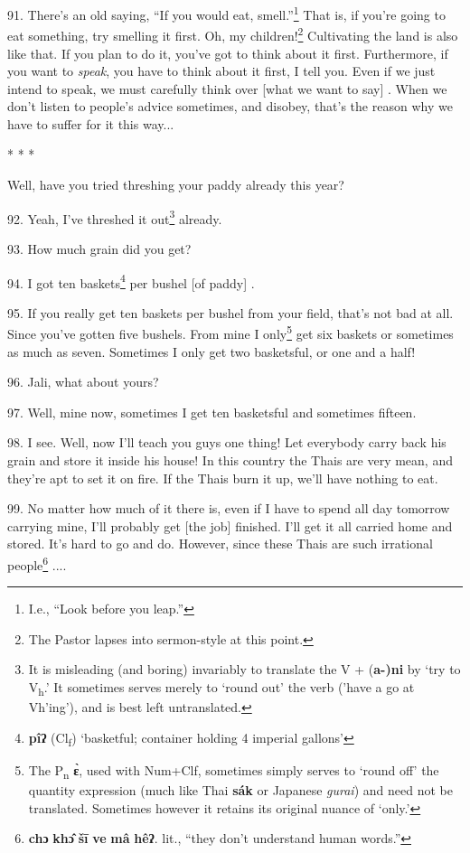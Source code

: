 91. There's an old saying, ``If you would eat, smell.''\footnote{I.e., ``Look before you leap.''} That
is, if you're going to eat something, try smelling it first. Oh, my children!\footnote{The Pastor lapses into sermon-style at this point.}
Cultivating the land is also like that. If you plan to do it, you've got to think
about it first. Furthermore, if you want to \textit{speak}, you have to think about
it first, I tell you. Even if we just intend to speak, we must carefully think
over [what we want to say] . When we don't listen to people's advice sometimes,
and disobey, that's the reason why we have to suffer for it this way...

\begin{center}
* * *
\end{center}

Well, have you tried threshing your paddy already this year?

92. Yeah, I've threshed it out\footnote{It is misleading (and boring) invariably to translate the V + (\textbf{a-)ni} by `try to V\textsubscript{h}.' It sometimes serves merely to `round out' the verb ('have a go at Vh'ing'), and is best left untranslated.} already.

93. How much grain did you get?

94. I got ten baskets\footnote{\textbf{pîʔ} (Cl\textsubscript{f}) `basketful; container holding 4 imperial gallons'} per bushel [of paddy] .

95. If you really get ten baskets per bushel from your field, that's not bad at
all. Since you've gotten five bushels. From mine I only\footnote{The P\textsubscript{n}  \textbf{ɛ̀}, used with Num+Clf, sometimes simply serves to `round off' the quantity expression (much like Thai \textbf{sák} or Japanese \textit{gurai}) and need not be translated. Sometimes however it retains its original nuance of `only.'} get six baskets or
sometimes as much as seven. Sometimes I only get two basketsful, or one and a half!

96. Jali, what about yours?

97. Well, mine now, sometimes I get ten basketsful and sometimes fifteen.

98. I see. Well, now I'll teach you guys one thing! Let everybody carry back his
grain and store it inside his house! In this country the Thais are very mean, and
they're apt to set it on fire. If the Thais burn it up, we'll have nothing to eat.

99. No matter how much of it there is, even if I have to spend all day tomorrow
carrying mine, I'll probably get [the job] finished. I'll get it all carried home
and stored. It's hard to go and do. However, since these Thais are such irrational
people\footnote{\textbf{chɔ} \textbf{khɔ̂} \textbf{šī} \textbf{ve} \textbf{mâ} \textbf{hêʔ}. lit., ``they don't understand human words.''} ....

